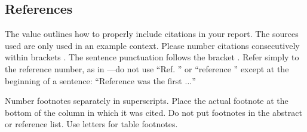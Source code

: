 














\subsection{References}
The value outlines how to properly include citations in your report. The sources used are only used in an example context.
Please number citations consecutively within brackets \cite{halter2008electrical}. The sentence punctuation follows the bracket \cite{jossinet1998impedivity}. Refer simply to the reference number, as in \cite{cole1941dispersion}---do not use ``Ref. \cite{cole1941dispersion}'' or ``reference \cite{cole1941dispersion}'' except at the beginning of a sentence: ``Reference \cite{cole1941dispersion} was the first $\ldots$''



Number footnotes separately in superscripts. Place the actual footnote at 
the bottom of the column in which it was cited. Do not put footnotes in the 
abstract or reference list. Use letters for table footnotes.



